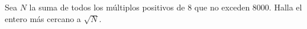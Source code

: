 Sea $N$ la suma de todos los múltiplos positivos de $8$ que no exceden $8000$. Halla el entero más cercano a $\sqrt{N}$.